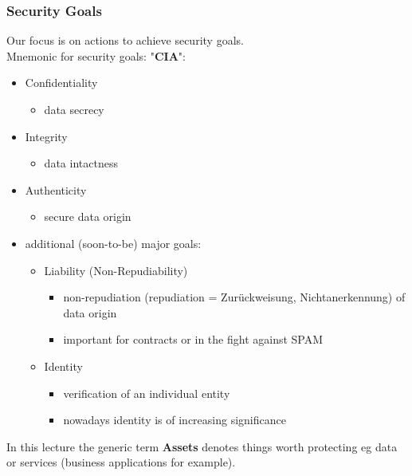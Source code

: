 \documentclass[11pt]{article}
\begin{document}
\subsubsection{Security Goals}
\label{sec:orge3676b6}
Our focus is on actions to achieve security goals.\\
Mnemonic for security goals: "\textbf{CIA}":
\begin{itemize}
\item Confidentiality
\begin{itemize}
\item data secrecy
\end{itemize}
\item Integrity
\begin{itemize}
\item data intactness
\end{itemize}
\item Authenticity
\begin{itemize}
\item secure data origin
\end{itemize}
\item additional (soon-to-be) major goals:
\begin{itemize}
\item Liability (Non-Repudiability)
\begin{itemize}
\item non-repudiation (repudiation = Zurückweisung, Nichtanerkennung) of data origin
\item important for contracts or in the fight against SPAM
\end{itemize}
\item Identity
\begin{itemize}
\item verification of an individual entity
\item nowadays identity is of increasing significance
\end{itemize}
\end{itemize}
\end{itemize}

In this lecture the generic term \textbf{Assets} denotes things worth protecting eg data or services (business applications for example).
\end{document}
